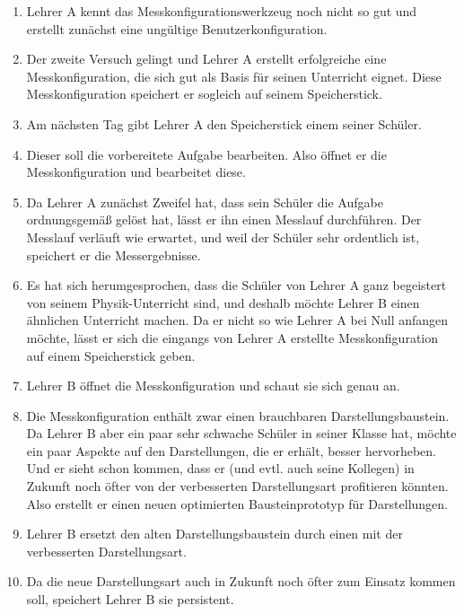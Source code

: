 \documentclass[parskip=full]{scrartcl}
\begin{document}
\begin{enumerate}
	\item Lehrer A kennt das Messkonfigurationswerkzeug noch nicht so gut und erstellt zunächst eine ungültige \gls{Benutzerkonfiguration}. 
	
	\item Der zweite Versuch gelingt und Lehrer A erstellt erfolgreiche eine Messkonfiguration, die sich gut als Basis für seinen Unterricht eignet. Diese Messkonfiguration speichert er sogleich auf seinem Speicherstick.
	
	\item Am nächsten Tag gibt Lehrer A den Speicherstick einem seiner Schüler. 
	
	\item Dieser soll die vorbereitete Aufgabe bearbeiten. Also öffnet er die Messkonfiguration und bearbeitet diese.
	
	\item Da Lehrer A zunächst Zweifel hat, dass sein Schüler die Aufgabe ordnungsgemäß gelöst hat, lässt er ihn einen Messlauf durchführen. Der Messlauf verläuft wie erwartet, und weil der Schüler sehr ordentlich ist, speichert er die Messergebnisse.
	
	\item Es hat sich herumgesprochen, dass die Schüler von Lehrer A ganz begeistert von seinem Physik-Unterricht sind, und deshalb möchte Lehrer B einen ähnlichen Unterricht machen. Da er nicht so wie Lehrer A bei Null anfangen möchte, lässt er sich die eingangs von Lehrer A erstellte Messkonfiguration auf einem Speicherstick geben. 
	
	\item Lehrer B öffnet die Messkonfiguration und schaut sie sich genau an.
	
	\item Die Messkonfiguration enthält zwar einen brauchbaren Darstellungsbaustein. Da Lehrer B aber ein paar sehr schwache Schüler in seiner Klasse hat, möchte ein paar Aspekte auf den Darstellungen, die er erhält, besser hervorheben. Und er sieht schon kommen, dass er (und evtl. auch seine Kollegen) in Zukunft noch öfter von der verbesserten Darstellungsart profitieren könnten. Also erstellt er einen neuen optimierten Bausteinprototyp für Darstellungen.
	
	\item Lehrer B ersetzt den alten Darstellungsbaustein durch einen mit der verbesserten Darstellungsart. 
	
	\item Da die neue Darstellungsart auch in Zukunft noch öfter zum Einsatz kommen soll, speichert Lehrer B sie persistent. 
	

\end{enumerate}
\end{document}
